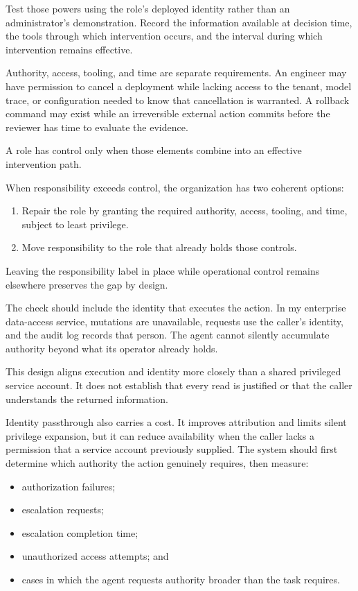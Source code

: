 Test those powers using the role's deployed identity rather than an administrator's demonstration. Record the information available at decision time, the tools through which intervention occurs, and the interval during which intervention remains effective.

Authority, access, tooling, and time are separate requirements. An engineer may have permission to cancel a deployment while lacking access to the tenant, model trace, or configuration needed to know that cancellation is warranted. A rollback command may exist while an irreversible external action commits before the reviewer has time to evaluate the evidence.

A role has control only when those elements combine into an effective intervention path.

When responsibility exceeds control, the organization has two coherent options:

\begin{enumerate}
\def\labelenumi{\arabic{enumi}.}
\tightlist
\item
  Repair the role by granting the required authority, access, tooling, and time, subject to least privilege.
\item
  Move responsibility to the role that already holds those controls.
\end{enumerate}

Leaving the responsibility label in place while operational control remains elsewhere preserves the gap by design.

The check should include the identity that executes the action. In my enterprise data-access service, mutations are unavailable, requests use the caller's identity, and the audit log records that person. The agent cannot silently accumulate authority beyond what its operator already holds.

This design aligns execution and identity more closely than a shared privileged service account. It does not establish that every read is justified or that the caller understands the returned information.

Identity passthrough also carries a cost. It improves attribution and limits silent privilege expansion, but it can reduce availability when the caller lacks a permission that a service account previously supplied. The system should first determine which authority the action genuinely requires, then measure:

\begin{itemize}
\tightlist
\item
  authorization failures;
\item
  escalation requests;
\item
  escalation completion time;
\item
  unauthorized access attempts; and
\item
  cases in which the agent requests authority broader than the task requires.
\end{itemize}

